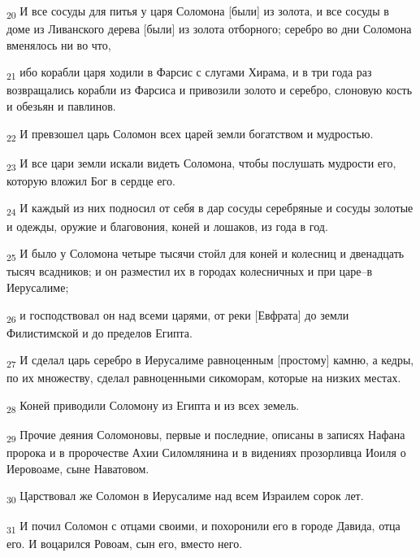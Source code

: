 \begin{tcolorbox}
\textsubscript{20} И все сосуды для питья у царя Соломона [были] из золота, и все сосуды в доме из Ливанского дерева [были] из золота отборного; серебро во дни Соломона вменялось ни во что,
\end{tcolorbox}
\begin{tcolorbox}
\textsubscript{21} ибо корабли царя ходили в Фарсис с слугами Хирама, и в три года раз возвращались корабли из Фарсиса и привозили золото и серебро, слоновую кость и обезьян и павлинов.
\end{tcolorbox}
\begin{tcolorbox}
\textsubscript{22} И превзошел царь Соломон всех царей земли богатством и мудростью.
\end{tcolorbox}
\begin{tcolorbox}
\textsubscript{23} И все цари земли искали видеть Соломона, чтобы послушать мудрости его, которую вложил Бог в сердце его.
\end{tcolorbox}
\begin{tcolorbox}
\textsubscript{24} И каждый из них подносил от себя в дар сосуды серебряные и сосуды золотые и одежды, оружие и благовония, коней и лошаков, из года в год.
\end{tcolorbox}
\begin{tcolorbox}
\textsubscript{25} И было у Соломона четыре тысячи стойл для коней и колесниц и двенадцать тысяч всадников; и он разместил их в городах колесничных и при царе--в Иерусалиме;
\end{tcolorbox}
\begin{tcolorbox}
\textsubscript{26} и господствовал он над всеми царями, от реки [Евфрата] до земли Филистимской и до пределов Египта.
\end{tcolorbox}
\begin{tcolorbox}
\textsubscript{27} И сделал царь серебро в Иерусалиме равноценным [простому] камню, а кедры, по их множеству, сделал равноценными сикоморам, которые на низких местах.
\end{tcolorbox}
\begin{tcolorbox}
\textsubscript{28} Коней приводили Соломону из Египта и из всех земель.
\end{tcolorbox}
\begin{tcolorbox}
\textsubscript{29} Прочие деяния Соломоновы, первые и последние, описаны в записях Нафана пророка и в пророчестве Ахии Силомлянина и в видениях прозорливца Иоиля о Иеровоаме, сыне Наватовом.
\end{tcolorbox}
\begin{tcolorbox}
\textsubscript{30} Царствовал же Соломон в Иерусалиме над всем Израилем сорок лет.
\end{tcolorbox}
\begin{tcolorbox}
\textsubscript{31} И почил Соломон с отцами своими, и похоронили его в городе Давида, отца его. И воцарился Ровоам, сын его, вместо него.
\end{tcolorbox}
